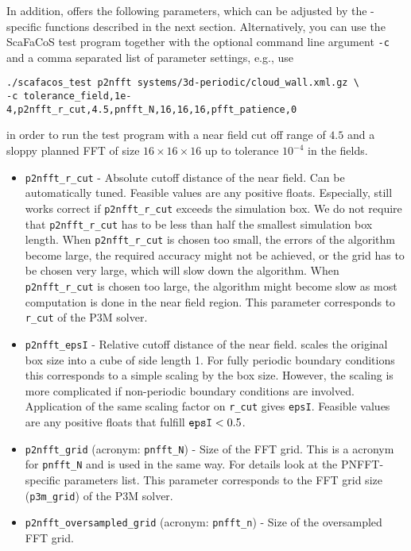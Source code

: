 In addition, \ptwonfft offers the following parameters, which can be adjusted by the \ptwonfft-specific functions described in the next section.
Alternatively, you can use the ScaFaCoS test program together with the optional command line argument \verb!-c! and a comma separated list
of parameter settings, e.g., use
\begin{verbatim}
./scafacos_test p2nfft systems/3d-periodic/cloud_wall.xml.gz \
-c tolerance_field,1e-4,p2nfft_r_cut,4.5,pnfft_N,16,16,16,pfft_patience,0
\end{verbatim}
in order to run the test program with a near field cut off range of $4.5$ and a sloppy planned FFT of size $16\times 16 \times 16$ up to tolerance $10^{-4}$ in the fields.
\begin{itemize}
  \item \verb!p2nfft_r_cut! -
    Absolute cutoff distance of the near field. Can be automatically tuned.
    Feasible values are any positive floats. Especially, \ptwonfft still works correct if \verb!p2nfft_r_cut! exceeds the simulation box.
    We do not require that \verb!p2nfft_r_cut! has to be less than half the smallest simulation box length.
    When \verb!p2nfft_r_cut! is chosen too small, the errors of the algorithm become large,
    the required accuracy might not be achieved, or the grid has to be chosen very large, which will slow down the algorithm.
    When \verb!p2nfft_r_cut! is chosen too large, the algorithm might become slow as most computation is done in the near field region.
    This parameter corresponds to \verb!r_cut! of the P3M solver.
  \item \verb!p2nfft_epsI! -
    Relative cutoff distance of the near field. \ptwonfft scales the original box size into a cube of side length 1.
    For fully periodic boundary conditions this corresponds to a simple scaling by the box size. However, the scaling is more complicated if non-periodic
    boundary conditions are involved. Application of the same scaling factor on \verb!r_cut! gives \verb!epsI!.
    Feasible values are any positive floats that fulfill $\verb!epsI! < 0.5$.
  \item \verb!p2nfft_grid! (acronym: \verb!pnfft_N!) -
    Size of the FFT grid. This is a acronym for \verb!pnfft_N! and is used in the same way. For details look at the PNFFT-specific parameters list.
    This parameter corresponds to the FFT grid size (\verb!p3m_grid!) of the P3M solver.
  \item \verb!p2nfft_oversampled_grid! (acronym: \verb!pnfft_n!) -
    Size of the oversampled FFT grid.

\end{itemize}
